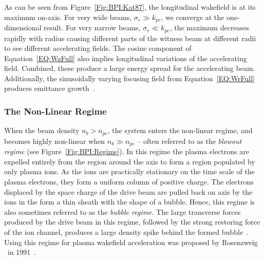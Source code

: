 As can be seen from Figure~\ref{Fig:BPI:Kat87}, the longitudinal wakefield is at its maximum on-axis.
For very wide beams, $\sigma_{r} \gg k_{pe}$, we converge at the one-dimensional result.
For very narrow beams, $\sigma_{r} \ll k_{pe}$, the maximum decreases rapidly with radius causing different parts of the witness beam at different radii to see different accelerating fields.
The cosine component of Equation~\ref{EQ:WzFull} also implies longitudinal variations of the accelerating field.
Combined, these produce a large energy spread for the accelerating beam.
Additionally, the sinusoidally varying focusing field from Equation~\ref{EQ:WrFull} produces emittance growth~\cite{muggli:2017,katsouleas:1987}.

\subsubsection{The Non-Linear Regime}
\label{Int:BPI:NLin}

When the beam density $n_{b} > n_{pe}$, the system enters the non-linear regime, and becomes highly non-linear when $n_{b} \gg n_{pe}$ -- often referred to as the \textit{blowout regime} (see Figure~\ref{Fig:BPI:Regime}).
In this regime the plasma electrons are expelled entirely from the region around the axis to form a region populated by only plasma ions.
As the ions are practically stationary on the time scale of the plasma electrons, they form a uniform column of positive charge.
The electrons displaced by the space charge of the drive beam are pulled back on axis by the ions in the form a thin sheath with the shape of a bubble.
Hence, this regime is also sometimes referred to as the \textit{bubble regime}.
The large transverse forces produced by the drive beam in this regime, followed by the strong restoring force of the ion channel, produces a large density spike behind the formed bubble~\cite{dawson:1959,rosenzweig:1991}.
Using this regime for plasma wakefield acceleration was proposed by Rosenzweig \etal ~in 1991~\cite{rosenzweig:1991}.

